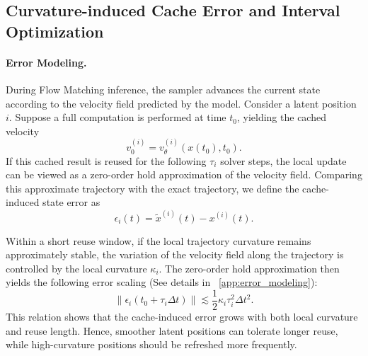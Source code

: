 \subsection{Curvature-induced Cache Error and Interval Optimization}
\label{sec:error_optimization}

\paragraph{\textbf{Error Modeling.}}
During Flow Matching inference, the sampler advances the current state
according to the velocity field predicted by the model. Consider a latent
position $i$. Suppose a full computation is performed at time $t_0$,
yielding the cached velocity
\begin{equation}
    v_0^{(i)}
    =
    v_\theta^{(i)}(x(t_0), t_0).
    \label{eq:cached_velocity}
\end{equation}
If this cached result is reused for the following $\tau_i$ solver steps,
the local update can be viewed as a zero-order hold approximation of the
velocity field. Comparing this approximate trajectory with the exact
trajectory, we define the cache-induced state error as
\begin{equation}
    \epsilon_i(t)
    =
    \tilde{x}^{(i)}(t)
    -
    x^{(i)}(t).
    \label{eq:cache_state_error}
\end{equation}

Within a short reuse window, if the local trajectory curvature remains
approximately stable, the variation of the velocity field along the
trajectory is controlled by the local curvature $\kappa_i$. The
zero-order hold approximation then yields the following error scaling (See details in ~\ref{app:error_modeling}):
\begin{equation}
    \left\|
    \epsilon_i(t_0 + \tau_i \Delta t)
    \right\|
    \lesssim
    \frac{1}{2}
    \kappa_i
    \tau_i^2
    \Delta t^2.
    \label{eq:cache_error_bound}
\end{equation}
This relation shows that the cache-induced error grows with both local
curvature and reuse length. Hence, smoother latent positions can tolerate
longer reuse, while high-curvature positions should be refreshed more
frequently.


